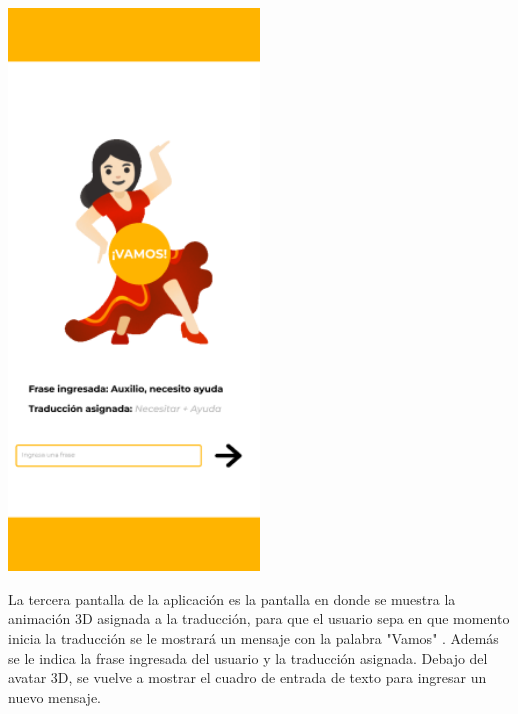 \begin{center}
    \includegraphics[width=0.5\textwidth]{Images/Cap 3/Pantalla3.png}
\end{center}

La tercera pantalla de la aplicación es la pantalla en donde se muestra la animación 3D asignada a la traducción, para que el usuario sepa en que momento inicia la traducción se le mostrará un mensaje con la palabra "Vamos" . Además se le indica la frase ingresada del usuario y la traducción asignada. Debajo del avatar 3D, se vuelve a mostrar el cuadro de entrada de texto para ingresar un nuevo mensaje.

